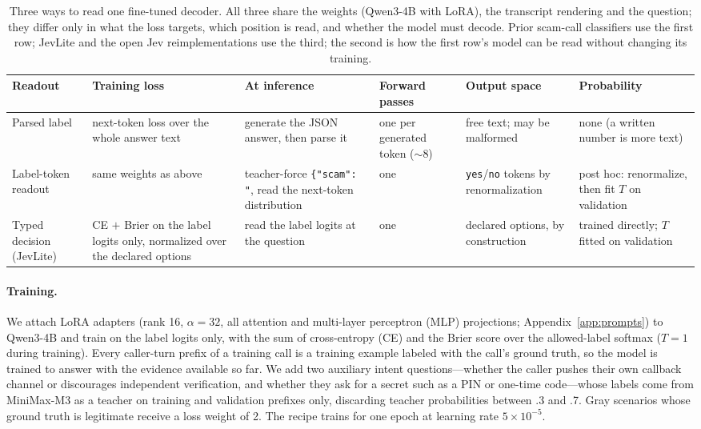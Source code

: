 \documentclass[11pt]{article}
\begin{document}
\begin{table}[t]
\centering
\small
\setlength{\tabcolsep}{4pt}
\renewcommand{\arraystretch}{1.15}
\begin{tabular}{@{}>{\raggedright\arraybackslash}p{2.4cm}>{\raggedright\arraybackslash}p{2.7cm}>{\raggedright\arraybackslash}p{2.9cm}>{\raggedright\arraybackslash}p{1.7cm}>{\raggedright\arraybackslash}p{2.3cm}>{\raggedright\arraybackslash}p{2.6cm}@{}}
\toprule
\textbf{Readout} & \textbf{Training loss} & \textbf{At inference} & \textbf{Forward passes} & \textbf{Output space} & \textbf{Probability} \\
\midrule
Parsed label & next-token loss over the whole answer text & generate the JSON answer, then parse it & one per generated token ($\sim$8) & free text; may be malformed & none (a written number is more text) \\
Label-token readout & same weights as above & teacher-force \texttt{\{"scam": "}, read the next-token distribution & one & \texttt{yes}/\texttt{no} tokens by renormalization & post hoc: renormalize, then fit $T$ on validation \\
Typed decision (JevLite) & CE $+$ Brier on the label logits only, normalized over the declared options & read the label logits at the question & one & declared options, by construction & trained directly; $T$ fitted on validation \\
\bottomrule
\end{tabular}
\caption{Three ways to read one fine-tuned decoder. All three share the weights (Qwen3-4B with LoRA), the transcript rendering and the question; they differ only in what the loss targets, which position is read, and whether the model must decode. Prior scam-call classifiers use the first row; JevLite and the open Jev reimplementations use the third; the second is how the first row's model can be read without changing its training.}
\label{tab:readouts}
\end{table}

\paragraph{Training.} We attach LoRA adapters \citep{hu2022lora} (rank 16, $\alpha=32$, all attention and multi-layer perceptron (MLP) projections; Appendix~\ref{app:prompts}) to Qwen3-4B \citep{qwen3} and train on the label logits only, with the sum of cross-entropy (CE) and the Brier score over the allowed-label softmax ($T=1$ during training). Every caller-turn prefix of a training call is a training example labeled with the call's ground truth, so the model is trained to answer with the evidence available so far. We add two auxiliary intent questions---whether the caller pushes their own callback channel or discourages independent verification, and whether they ask for a secret such as a PIN or one-time code---whose labels come from MiniMax-M3 as a teacher on training and validation prefixes only, discarding teacher probabilities between .3 and .7. Gray scenarios whose ground truth is legitimate receive a loss weight of 2. The recipe trains for one epoch at learning rate $5\times10^{-5}$.
\end{document}

